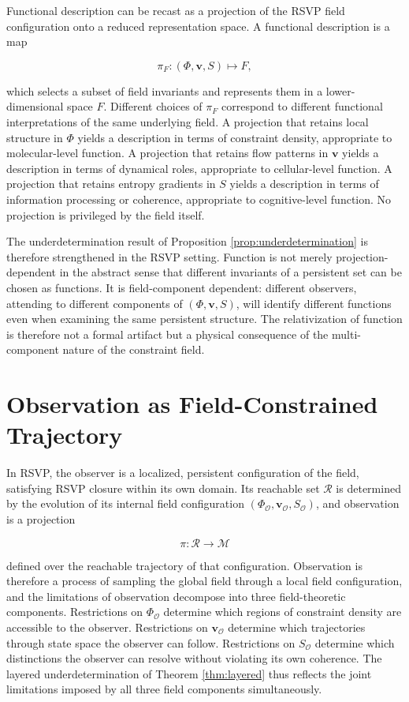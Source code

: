 \documentclass[12pt, a4paper, oneside]{article}
\theoremstyle{plain}
\theoremstyle{definition}
\theoremstyle{remark}
\newcommand{\M}{\mathcal{M}}
\newcommand{\Obs}{\mathcal{O}}
\newcommand{\R}{\mathcal{R}}
\newcommand{\proj}{\pi}
\begin{document}
Functional description can be recast as a projection of the RSVP field configuration onto a reduced representation space. A functional description is a map

\begin{equation}
\proj_F : (\Phi, \mathbf{v}, S) \mapsto F,
\end{equation}

which selects a subset of field invariants and represents them in a lower-dimensional space $F$. Different choices of $\proj_F$ correspond to different functional interpretations of the same underlying field. A projection that retains local structure in $\Phi$ yields a description in terms of constraint density, appropriate to molecular-level function. A projection that retains flow patterns in $\mathbf{v}$ yields a description in terms of dynamical roles, appropriate to cellular-level function. A projection that retains entropy gradients in $S$ yields a description in terms of information processing or coherence, appropriate to cognitive-level function. No projection is privileged by the field itself.

The underdetermination result of Proposition \ref{prop:underdetermination} is therefore strengthened in the RSVP setting. Function is not merely projection-dependent in the abstract sense that different invariants of a persistent set can be chosen as functions. It is field-component dependent: different observers, attending to different components of $(\Phi, \mathbf{v}, S)$, will identify different functions even when examining the same persistent structure. The relativization of function is therefore not a formal artifact but a physical consequence of the multi-component nature of the constraint field.

\section{Observation as Field-Constrained Trajectory}

In RSVP, the observer is a localized, persistent configuration of the field, satisfying RSVP closure within its own domain. Its reachable set $\R$ is determined by the evolution of its internal field configuration $(\Phi_\Obs, \mathbf{v}_\Obs, S_\Obs)$, and observation is a projection

\begin{equation}
\proj : \R \to \M
\end{equation}

defined over the reachable trajectory of that configuration. Observation is therefore a process of sampling the global field through a local field configuration, and the limitations of observation decompose into three field-theoretic components. Restrictions on $\Phi_\Obs$ determine which regions of constraint density are accessible to the observer. Restrictions on $\mathbf{v}_\Obs$ determine which trajectories through state space the observer can follow. Restrictions on $S_\Obs$ determine which distinctions the observer can resolve without violating its own coherence. The layered underdetermination of Theorem \ref{thm:layered} thus reflects the joint limitations imposed by all three field components simultaneously.
\end{document}
